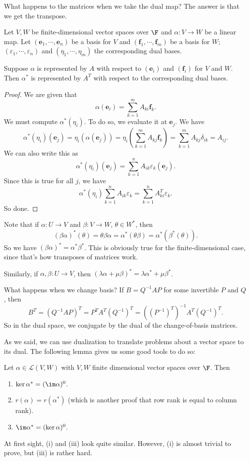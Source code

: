 \documentclass[a4paper]{article}
\begin{document}
What happens to the matrices when we take the dual map? The answer is that we get the transpose.
\begin{prop}
  Let $V, W$ be finite-dimensional vector spaces over $\F$ and $\alpha: V\to W$ be a linear map. Let $(\mathbf{e}_1, \cdots, \mathbf{e}_n)$ be a basis for $V$ and $(\mathbf{f}_1, \cdots, \mathbf{f}_m)$ be a basis for $W$; $(\varepsilon_1, \cdots, \varepsilon_n)$ and $(\eta_1, \cdots, \eta_m)$ the corresponding dual bases.

  Suppose $\alpha$ is represented by $A$ with respect to $(\mathbf{e}_i)$ and $(\mathbf{f}_i)$ for $V$ and $W$. Then $\alpha^*$ is represented by $A^T$ with respect to the corresponding dual bases.
\end{prop}

\begin{proof}
  We are given that
  \[
    \alpha (\mathbf{e}_i) = \sum_{k = 1}^m A_{ki}\mathbf{f}_k.
  \]
  We must compute $\alpha^*(\eta_i)$. To do so, we evaluate it at $\mathbf{e}_j$. We have
  \[
    \alpha^*(\eta_i)(\mathbf{e}_j) = \eta_i(\alpha(\mathbf{e}_j)) = \eta_i\left(\sum_{k = 1}^m A_{kj}\mathbf{f}_k\right) = \sum_{k = 1}^m A_{kj} \delta_{ik} = A_{ij}.
  \]
  We can also write this as
  \[
    \alpha^*(\eta_i)(\mathbf{e}_j) = \sum_{k = 1}^n A_{ik} \varepsilon_k (\mathbf{e}_j).
  \]
  Since this is true for all $j$, we have
  \[
    \alpha^*(\eta_i) \sum_{k = 1}^n A_{ik}\varepsilon_k = \sum_{k = 1}^n A_{ki}^T \varepsilon_k.
  \]
  So done.
\end{proof}

Note that if $\alpha: U\to V$ and $\beta: V\to W$, $\theta \in W^*$, then
\[
  (\beta\alpha)^*(\theta) = \theta\beta\alpha = \alpha^*(\theta\beta) = \alpha^*(\beta^*(\theta)).
\]
So we have $(\beta\alpha)^* = \alpha^*\beta^*$. This is obviously true for the finite-dimensional case, since that's how transposes of matrices work.

Similarly, if $\alpha, \beta: U \to V$, then $(\lambda\alpha + \mu\beta)^* = \lambda\alpha^* + \mu\beta^*$.

What happens when we change basis? If $B = Q^{-1}AP$ for some invertible $P$ and $Q$, then
\[
  B^T = (Q^{-1}AP)^T = P^TA^T(Q^{-1})^T = ((P^{-1})^T)^{-1} A^T (Q^{-1})^T.
\]
So in the dual space, we conjugate by the dual of the change-of-basis matrices.

As we said, we can use dualization to translate problems about a vector space to its dual. The following lemma gives us some good tools to do so:
\begin{lemma}
  Let $\alpha \in \mathcal{L}(V, W)$ with $V, W$ finite dimensional vector spaces over $\F$. Then
  \begin{enumerate}
    \item $\ker \alpha^* = (\im \alpha)^0$.
    \item $r(\alpha) = r(\alpha^*)$ (which is another proof that row rank is equal to column rank).
    \item $\im \alpha^* = (\ker \alpha)^0$.
  \end{enumerate}
\end{lemma}
At first sight, (i) and (iii) look quite similar. However, (i) is almost trivial to prove, but (iii) is rather hard.
\end{document}
